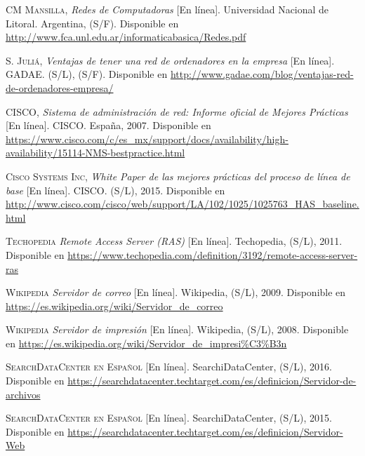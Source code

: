 
\begin{thebibliography}{X}

		\textsc{CM Mansilla,}
		\textit{Redes de Computadoras} [En línea].
		Universidad Nacional de Litoral. Argentina, (S/F). 
		\newline
		Disponible en 
		\url{http://www.fca.unl.edu.ar/informaticabasica/Redes.pdf}

		\textsc{S. Juliá,}
		\textit{Ventajas de tener una red de ordenadores en la empresa} [En línea].
		GADAE. (S/L), (S/F). 
		\newline
		Disponible en 
		\url{http://www.gadae.com/blog/ventajas-red-de-ordenadores-empresa/}

		\textsc{CISCO,}
		\textit{Sistema de administración de red: Informe oficial de Mejores Prácticas} [En línea].
		CISCO. España, 2007. 
		\newline
		Disponible en 
		\url{https://www.cisco.com/c/es_mx/support/docs/availability/high-availability/15114-NMS-bestpractice.html}

		\textsc{Cisco Systems Inc,}
		\textit{White Paper de las mejores prácticas del proceso de línea de base} [En línea].
		CISCO. (S/L), 2015. 
		\newline
		Disponible en 
		\url{http://www.cisco.com/cisco/web/support/LA/102/1025/1025763_HAS_baseline.html}

		\textsc{Techopedia}
		\textit{Remote Access Server (RAS)} [En línea].
		Techopedia, (S/L), 2011.
		\newline
		Disponible en
		\url{https://www.techopedia.com/definition/3192/remote-access-server-ras}

		\textsc{Wikipedia}
		\textit{Servidor de correo} [En línea].
		Wikipedia, (S/L), 2009.
		\newline
		Disponible en
		\url{https://es.wikipedia.org/wiki/Servidor_de_correo}
		
		\textsc{Wikipedia}
		\textit{Servidor de impresión} [En línea].
		Wikipedia, (S/L), 2008.
		\newline
		Disponible en
		\url{https://es.wikipedia.org/wiki/Servidor_de_impresi\%C3\%B3n}

		\textsc{SearchDataCenter en Español} [En línea].
		SearchiDataCenter, (S/L), 2016.
		\newline
		Disponible en
		\url{https://searchdatacenter.techtarget.com/es/definicion/Servidor-de-archivos}

		\textsc{SearchDataCenter en Español} [En línea].
		SearchiDataCenter, (S/L), 2015.
		\newline
		Disponible en
		\url{https://searchdatacenter.techtarget.com/es/definicion/Servidor-Web}

\end{thebibliography}

